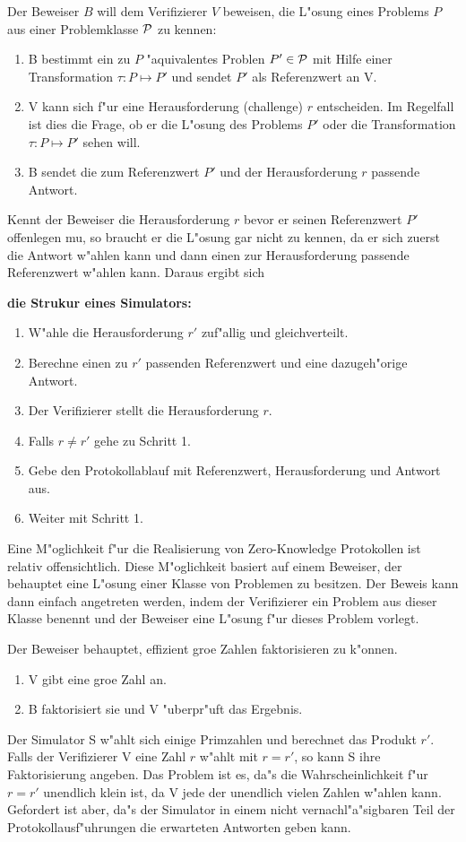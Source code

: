 Der Beweiser $B$ will dem Verifizierer $V$ beweisen, die L"osung eines
Problems $P$ aus einer Problemklasse ${\cal P}$ zu kennen:
\begin{enumerate}
  \item B bestimmt ein zu $P$ "aquivalentes Problen $P'\in {\cal P}$
        mit Hilfe einer Transformation $\tau : P \mapsto P'$ und
        sendet $P'$ als Referenzwert an V.
  \item V kann sich f"ur eine Herausforderung (challenge) $r$
        entscheiden. Im Regelfall ist dies die Frage, ob er die
        L"osung des Problems $P'$ oder die Transformation $\tau : P
        \mapsto P'$ sehen will.
  \item B sendet die zum Referenzwert $P'$ und der Herausforderung $r$
        passende Antwort.
\end{enumerate}

Kennt der Beweiser die Herausforderung $r$ bevor er seinen
Referenzwert $P'$ offenlegen mu\3, so braucht er die L"osung gar nicht
zu kennen, da er sich zuerst die Antwort w"ahlen kann und dann einen zur
Herausforderung passende Referenzwert w"ahlen kann. Daraus ergibt sich

{\bf die Strukur eines Simulators:}
\begin{enumerate}
  \item W"ahle die Herausforderung $r'$ zuf"allig und gleichverteilt.
  \item Berechne einen zu $r'$ passenden Referenzwert und eine 
        dazugeh"orige Antwort.
  \item Der Verifizierer stellt die Herausforderung $r$.
  \item Falls $r \neq r'$ gehe zu Schritt 1.
  \item Gebe den Protokollablauf mit Referenzwert, Herausforderung und 
        Antwort aus.
  \item Weiter mit Schritt 1.
\end{enumerate}
Eine M"oglichkeit f"ur die Realisierung von Zero-Knowledge Protokollen
ist relativ offensichtlich. Diese M"oglichkeit basiert auf einem
Beweiser, der behauptet eine L"osung einer Klasse von Problemen zu
besitzen. Der Beweis kann dann einfach angetreten werden, indem der
Verifizierer ein Problem aus dieser Klasse benennt und der Beweiser
eine L"osung f"ur dieses Problem vorlegt.
\begin{beispiel}[Faktorisieren] 
Der Beweiser behauptet, effizient gro\3e Zahlen faktorisieren zu k"onnen.
  \begin{enumerate}
    \item V gibt eine gro\3e Zahl an.
    \item B faktorisiert sie und V "uberpr"uft das Ergebnis.
  \end{enumerate}
Der Simulator S w"ahlt sich einige Primzahlen und berechnet das Produkt
$r'$. Falls der Verifizierer V eine Zahl $r$ w"ahlt mit $r=r'$, so
kann S ihre Faktorisierung angeben. Das Problem ist es, da"s
die Wahrscheinlichkeit f"ur $r=r'$ unendlich klein ist, da V jede
der unendlich vielen Zahlen w"ahlen kann. Gefordert ist aber, da"s der
Simulator in einem nicht vernachl"a"sigbaren Teil der 
Protokollausf"uhrungen die erwarteten Antworten geben kann.
\end{beispiel}

